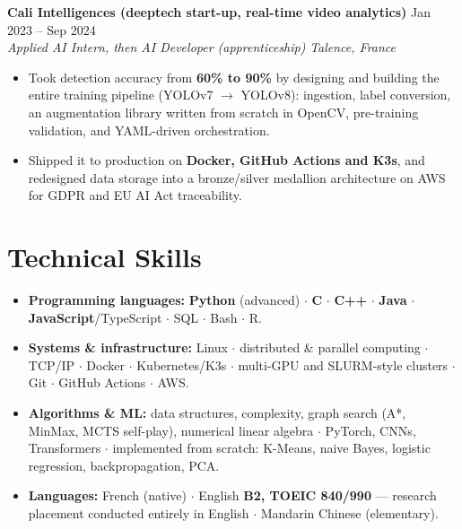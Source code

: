 \documentclass[10pt, letterpaper]{article}
\newcommand{\entry}[4]{%
  \noindent \textbf{#1} \hfill #2 \\
  \textit{#3} \hfill \textit{#4} \par
}
\begin{document}
\vspace{1pt}

\entry{Cali Intelligences (deeptech start-up, real-time video analytics)}{Jan 2023 -- Sep 2024}%
{Applied AI Intern, then AI Developer (apprenticeship)}{Talence, France}
\begin{itemize}
    \item Took detection accuracy from \textbf{60\% to 90\%} by designing and building the entire training pipeline (YOLOv7 $\to$ YOLOv8): ingestion, label conversion, an augmentation library written from scratch in OpenCV, pre-training validation, and YAML-driven orchestration.
    \item Shipped it to production on \textbf{Docker, GitHub Actions and K3s}, and redesigned data storage into a bronze/silver medallion architecture on AWS for GDPR and EU AI Act traceability.
\end{itemize}

\section{Technical Skills}
\begin{itemize}
    \item \textbf{Programming languages:} \textbf{Python} (advanced) $\cdot$ \textbf{C} $\cdot$ \textbf{C++} $\cdot$ \textbf{Java} $\cdot$ \textbf{JavaScript}/TypeScript $\cdot$ SQL $\cdot$ Bash $\cdot$ R.
    \item \textbf{Systems \& infrastructure:} Linux $\cdot$ distributed \& parallel computing $\cdot$ TCP/IP $\cdot$ Docker $\cdot$ Kubernetes/K3s $\cdot$ multi-GPU and SLURM-style clusters $\cdot$ Git $\cdot$ GitHub Actions $\cdot$ AWS.
    \item \textbf{Algorithms \& ML:} data structures, complexity, graph search (A*, MinMax, MCTS self-play), numerical linear algebra $\cdot$ PyTorch, CNNs, Transformers $\cdot$ implemented from scratch: K-Means, naive Bayes, logistic regression, backpropagation, PCA.
    \item \textbf{Languages:} French (native) $\cdot$ English \textbf{B2, TOEIC 840/990} --- research placement conducted entirely in English $\cdot$ Mandarin Chinese (elementary).
\end{itemize}

\end{document}
